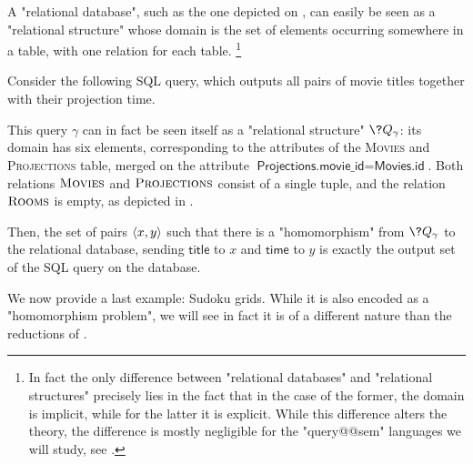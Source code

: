 \begin{example}
	\AP\label{ex:sql-as-hom}
	A "relational database", such as the one depicted on
	, can easily be seen as a "relational structure"
	whose domain is the set of elements occurring somewhere in a table,
	with one relation for each table.%
	\footnote{In fact the only difference between "relational databases" and "relational structures"
	precisely lies in the fact that in the case of the former, the domain is implicit,
	while for the latter it is explicit.
	While this difference alters the theory, the difference is mostly negligible
	for the "query@@sem" languages we will study, see .}

	Consider the following SQL query, which outputs all pairs
	of movie titles together with their projection time.
	

	This query $\gamma$ can in fact be seen itself as a "relational structure" $\?Q_\gamma$:
	its domain has six elements, corresponding to the attributes of
	the \textsc{Movies} and \textsc{Projections} table, merged on the attribute
	$\textsf{Projections.movie\_id} = \textsf{Movies.id}$.
	Both relations $\textsc{Movies}$ and $\textsc{Projections}$ consist of a single tuple,
	and the relation $\textsc{Rooms}$ is empty, as depicted in .

	Then, the set of pairs $\langle x, y\rangle$
	such that there is a "homomorphism" from $\?Q_\gamma$ to the relational database,
	sending $\textsf{title}$ to $x$ and $\textsf{time}$ to $y$
	is exactly the output set of the SQL query on the database.
\end{example}

We now provide a last example: Sudoku grids. While it is also encoded
as a "homomorphism problem", we will see in fact it
is of a different nature than the reductions of .


